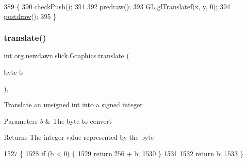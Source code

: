 \begin{DoxyCode}
389                                             \{
390         \mbox{\hyperlink{classorg_1_1newdawn_1_1slick_1_1_graphics_a58dfa60d60ec7f56b17e420458b3724e}{checkPush}}();
391 
392         \mbox{\hyperlink{classorg_1_1newdawn_1_1slick_1_1_graphics_a7b4c203181e3b6302d51ed9b24596b8d}{predraw}}();
393         \mbox{\hyperlink{classorg_1_1newdawn_1_1slick_1_1_graphics_a39ca68db81b225982a4421c4a6835eed}{GL}}.\mbox{\hyperlink{interfaceorg_1_1newdawn_1_1slick_1_1opengl_1_1renderer_1_1_s_g_l_a647aff6cabd0c83869166144e9aee833}{glTranslatef}}(x, y, 0);
394         \mbox{\hyperlink{classorg_1_1newdawn_1_1slick_1_1_graphics_abe054371d1486618ff327bbbcf02ff97}{postdraw}}();
395     \}
\end{DoxyCode}
\mbox{\label{classorg_1_1newdawn_1_1slick_1_1_graphics_a83b55b8d458c49ea67ae7367efdbbf69}} 
\subsubsection{\texorpdfstring{translate()}{translate()}\hspace{0.1cm}{\footnotesize\ttfamily [2/2]}}
{\footnotesize\ttfamily int org.\+newdawn.\+slick.\+Graphics.\+translate (\begin{DoxyParamCaption}\item[{byte}]{b }\end{DoxyParamCaption})\hspace{0.3cm}{\ttfamily [inline]}, {\ttfamily [private]}}

Translate an unsigned int into a signed integer


\begin{DoxyParams}{Parameters}
{\em b} & The byte to convert \\
\hline
\end{DoxyParams}
\begin{DoxyReturn}{Returns}
The integer value represented by the byte 
\end{DoxyReturn}

\begin{DoxyCode}
1527                                   \{
1528         \textcolor{keywordflow}{if} (b < 0) \{
1529             \textcolor{keywordflow}{return} 256 + b;
1530         \}
1531 
1532         \textcolor{keywordflow}{return} b;
1533     \}
\end{DoxyCode}


